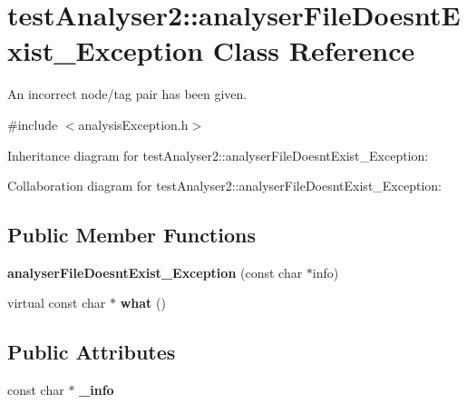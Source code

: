 \hypertarget{classtestAnalyser2_1_1analyserFileDoesntExist__Exception}{}\section{test\+Analyser2\+::analyser\+File\+Doesnt\+Exist\+\_\+\+Exception Class Reference}
\label{classtestAnalyser2_1_1analyserFileDoesntExist__Exception}


An incorrect node/tag pair has been given.  




{\ttfamily \#include $<$analysis\+Exception.\+h$>$}



Inheritance diagram for test\+Analyser2\+::analyser\+File\+Doesnt\+Exist\+\_\+\+Exception\+:


Collaboration diagram for test\+Analyser2\+::analyser\+File\+Doesnt\+Exist\+\_\+\+Exception\+:
\subsection*{Public Member Functions}
\begin{DoxyCompactItemize}
\item 
\mbox{\label{classtestAnalyser2_1_1analyserFileDoesntExist__Exception_ac5edc7582e88aebb32879ae123787aac}} 
{\bfseries analyser\+File\+Doesnt\+Exist\+\_\+\+Exception} (const char $\ast$info)
\item 
\mbox{\label{classtestAnalyser2_1_1analyserFileDoesntExist__Exception_a51d01f03eb1e3ccda8ee1947c88ad43c}} 
virtual const char $\ast$ {\bfseries what} ()
\end{DoxyCompactItemize}
\subsection*{Public Attributes}
\begin{DoxyCompactItemize}
\item 
\mbox{\label{classtestAnalyser2_1_1analyserFileDoesntExist__Exception_a6086ee6147d879de3e6c41bb80e25e64}} 
const char $\ast$ {\bfseries \+\_\+info}
\end{DoxyCompactItemize}
